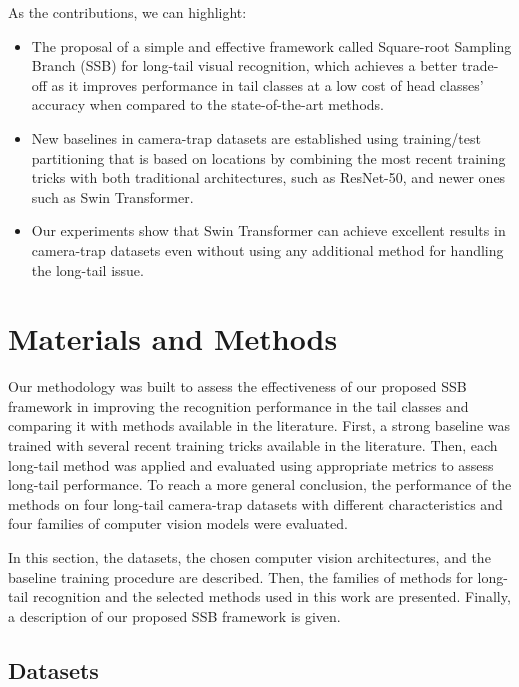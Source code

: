 As the contributions, we can highlight:
\begin{itemize}
\item The proposal of a simple and effective framework called Square-root
Sampling Branch (SSB) for long-tail visual recognition, which achieves a better
trade-off as it improves performance in tail classes at a low cost of head
classes’ accuracy when compared to the state-of-the-art methods.

\item New baselines in camera-trap datasets are established using training/test
partitioning that is based on locations by combining the most recent training
tricks with both traditional architectures, such as ResNet-50, and newer ones
such as Swin Transformer.

\item Our experiments show that Swin Transformer can achieve excellent results
in camera-trap datasets even without using any additional method for handling
the long-tail issue.
\end{itemize}

\section{Materials and Methods}

Our methodology was built to assess the effectiveness of our proposed SSB
framework in improving the recognition performance in the tail classes and
comparing it with methods available in the literature. First, a strong baseline
was trained with several recent training tricks available in the literature.
Then, each long-tail method was applied and evaluated using appropriate metrics
to assess long-tail performance. To reach a more general conclusion, the
performance of the methods on four long-tail camera-trap datasets with different
characteristics and four families of computer vision models were evaluated.

In this section, the datasets, the chosen computer vision architectures,
and the baseline training procedure are described. Then, the families of methods
for long-tail recognition and the selected methods used in this work are
presented. Finally, a description of our proposed SSB framework is given.

\subsection{Datasets}

